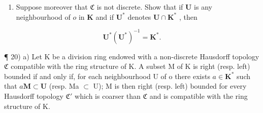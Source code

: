 \begin{enumerate}
\def\labelenumi{\alph{enumi})}
\setcounter{enumi}{1}
\tightlist
\item
  Suppose moreover that \(\mathfrak{C}\) is not discrete. Show that if \(\mathbf{U}\) is any neighbourhood of \(o\) in \(\mathbf{K}\) and if \(\mathbf{U}^*\) denotes \(\mathbf{U} \cap \mathbf{K}^*\) , then
\end{enumerate}

\[
\mathbf {U} ^ {*} (\mathbf {U} ^ {*}) ^ {- 1} = \mathbf {K} ^ {*}.
\]

¶ 20) a) Let K be a division ring endowed with a non-discrete Hausdorff topology \(\mathfrak{C}\) compatible with the ring structure of K. A subset M of K is right (resp. left) bounded if and only if, for each neighbourhood U of o there exists \(a \in \mathbf{K}^*\) such that \(a\mathbf{M} \subset \mathbf{U}\) (resp. Ma \(\subset\) U); M is then right (resp. left) bounded for every Hausdorff topology \(\mathfrak{C}'\) which is coarser than \(\mathfrak{C}\) and is compatible with the ring structure of K.

